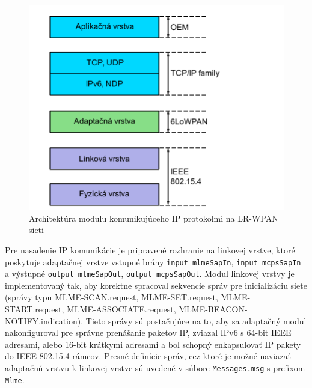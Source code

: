 \begin{figure}[htbp]
\begin{center}
\includegraphics[width=120mm]{figures/ip_ieee}
\caption{Architektúra modulu komunikujúceho IP protokolmi na LR-WPAN sieti}
\label{fig:ip_ieee}
\end{center}
\end{figure}
\indent Pre nasadenie IP komunikácie je pripravené rozhranie na linkovej vrstve, ktoré poskytuje adaptačnej vrstve vstupné brány \texttt{input mlmeSapIn}, \texttt{input mcpsSapIn} a výstupné \texttt{output mlmeSapOut}, \texttt{output mcpsSapOut}. Modul linkovej vrstvy je implementovaný tak, aby korektne spracoval sekvencie správ pre inicializáciu siete (správy typu MLME-SCAN.request, MLME-SET.request, MLME-START.request, MLME-ASSOCIATE.request, MLME-BEACON-NOTIFY.indication). Tieto správy sú postačujúce na to, aby sa adaptačný modul nakonfiguroval pre správne prenášanie paketov IP, zviazal IPv6 s 64-bit IEEE adresami, alebo 16-bit krátkymi adresami a bol schopný enkapsulovať IP pakety do IEEE 802.15.4 rámcov. Presné definície správ, cez ktoré je možné naviazať adaptačnú vrstvu k linkovej vrstve sú uvedené v súbore \texttt{Messages.msg} s prefixom \texttt{Mlme}.
